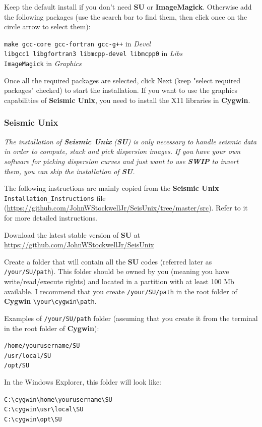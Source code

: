 \documentclass[twoside,a4paper]{article}
\def\SWIP{\textbf{SWIP}}
\def\SU{\textbf{SU}}
\def\SeismicUnix{\textbf{Seismic Unix}}
\def\ImageMagick{\textbf{ImageMagick}}
\def\Cygwin{\textbf{Cygwin}}
\begin{document}
Keep the default install if you don't need {\SU} or {\ImageMagick}. Otherwise add the following packages (use the search bar to find them, then click once on the circle arrow to select them):

\verb|make gcc-core gcc-fortran gcc-g++| in \textit{Devel}\\
\verb|libgcc1 libgfortran3 libmcpp-devel libmcpp0| in \textit{Libs}\\
\verb|ImageMagick| in \textit{Graphics}

Once all the required packages are selected, click Next (keep "select required packages" checked) to start the installation. If you want to use the graphics capabilities of {\SeismicUnix}, you need to install the X11 libraries in {\Cygwin}.

\subsubsection{Seismic Unix}
\label{subsec:WinSU}
\textit{The installation of {\SeismicUnix} ({\SU}) is only necessary to handle seismic data in order to compute, stack and pick dispersion images. If you have your own software for picking dispersion curves and just want to use {\SWIP} to invert them, you can skip the installation of {\SU}.}

The following instructions are mainly copied from the {\SeismicUnix} \verb|Installation_Instructions| file (\url{https://github.com/JohnWStockwellJr/SeisUnix/tree/master/src}). Refer to it for more detailed instructions.

Download the latest stable version of {\SU} at \url{https://github.com/JohnWStockwellJr/SeisUnix}

Create a folder that will contain all the {\SU} codes (referred later as \verb|/your/SU/path|). This folder should be owned by you (meaning you have write/read/execute rights) and located in a partition with at least 100 Mb available. I recommend that you create \verb|/your/SU/path| in the root folder of {\Cygwin} \verb|\your\cygwin\path|.

Examples of \verb|/your/SU/path| folder (assuming that you create it from the terminal in the root folder of {\Cygwin}):

\verb|/home/yourusername/SU|\\
\verb|/usr/local/SU|\\
\verb|/opt/SU|

In the Windows Explorer, this folder will look like:

\verb|C:\cygwin\home\yourusername\SU|\\
\verb|C:\cygwin\usr\local\SU|\\
\verb|C:\cygwin\opt\SU|
\end{document}
